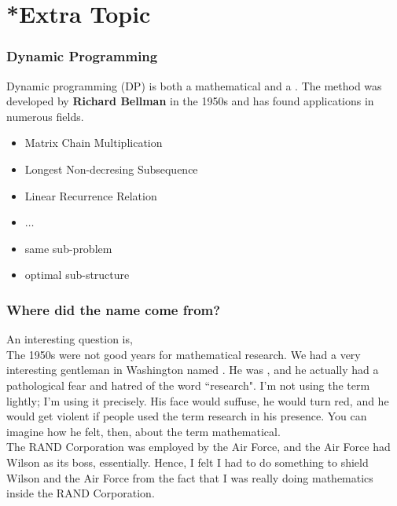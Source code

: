 \documentclass{beamer}
\begin{document}
\section{*Extra Topic}
\begin{frame}
    \frametitle{Dynamic Programming}
    \hh Dynamic programming (DP) is both a mathematical  
    and a . 
    The method was developed by \textbf{Richard Bellman} in the 1950s and has 
    found applications in numerous fields.
    \\ \vv 
    \begin{itemize}
        \item Matrix Chain Multiplication
        \item Longest Non-decresing Subsequence
        \item Linear Recurrence Relation
        \item $\dots$
    \end{itemize}
    \begin{itemize}
        \item same sub-problem
        \item optimal sub-structure
    \end{itemize}
\end{frame}
\begin{frame}
    \frametitle{Where did the name come from?}
    \hh 
    An interesting question is,  
    \\
    \vv \hh The 1950s were not good years for mathematical research.
    We had a very interesting gentleman in Washington named . 
    He was , and he actually had 
    a pathological fear and hatred of the word ``research". 
    I'm not using the term lightly; I'm using it precisely. 
    His face would suffuse, he would turn red, and he would get violent if people used the term research in his presence. 
    You can imagine how he felt, then, 
    about the term mathematical.
    \\ \hh The RAND Corporation was employed by the Air Force, and the Air Force had Wilson as its boss, essentially. 
    Hence, I felt I had to do something to shield Wilson and the Air Force from the fact that 
    I was really doing mathematics inside the RAND Corporation. 
    
\end{frame}
\end{document}
